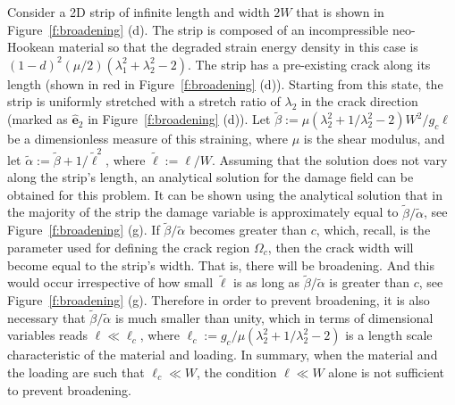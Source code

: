 \documentclass[10pt,letterpaper]{article}
\begin{document}
    Consider a 2D strip of infinite length and width $2W$ that is shown in Figure~\ref{f:broadening} (d).
    The strip is composed of an incompressible neo-Hookean material so that the degraded strain energy density in this case is $(1-d)^2 (\mu/2)(\lambda_1^2+\lambda_2^2-2)$.
    The strip has a pre-existing crack along its length (shown in red in Figure~\ref{f:broadening} (d)).
    Starting from this state, the strip is uniformly stretched with a stretch ratio of $\lambda_2$ in the crack direction (marked as $\hat{\mathbf{e}}_2$ in Figure~\ref{f:broadening} (d)).
    Let  $\tilde{\beta}:= \mu (\lambda_2^2+1/\lambda_2^2-2) W^2 /g_c  \ell$ be a dimensionless measure of this straining, where $\mu$ is the shear modulus, and let $\tilde{\alpha}:=\tilde{\beta}+1/\tilde{\ell}^{2}$, where $\tilde{\ell}:=\ell/W$.
    Assuming that the solution does not vary along the strip's length, an analytical solution for the damage field can be obtained for this problem.
    It can be shown using the analytical solution that in the majority of the strip the damage variable is approximately equal to $ \tilde{\beta}/\tilde{\alpha}$, see Figure~\ref{f:broadening} (g).
    If $ \tilde{\beta}/\tilde{\alpha}$ becomes greater than $c$, which, recall, is the parameter used for defining the crack region $\Omega_c$, then the crack width will become equal to the strip's width. That is, there will be broadening. And this would occur irrespective of how small $\tilde{\ell}$ is as long as $ \tilde{\beta}/\tilde{\alpha}$ is greater than $c$, see Figure~\ref{f:broadening} (g).
    Therefore in order to prevent broadening, it is also necessary that $\tilde{\beta}/\tilde{\alpha}$ is much smaller than unity, which in terms of dimensional variables reads $\ell \ll \ell_c$, where $\ell_c:=g_c/\mu (\lambda_2^2+1/\lambda_2^2-2)$ is a length scale characteristic of the material and loading.
    In summary, when the material and the loading are such that $\ell_c\ll W$, the condition $\ell \ll W$ alone is not sufficient to prevent broadening.
\end{document}
